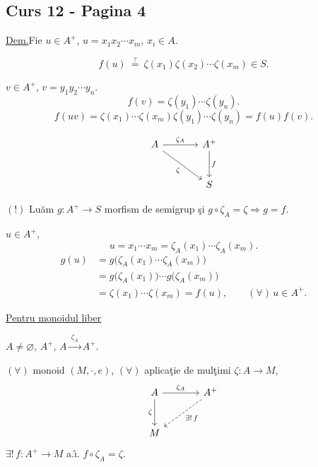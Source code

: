 
\subsection*{Curs 12 - Pagina 4}

\noindent\underline{Dem.}\quad Fie $u\in A^+$,
$u=x_1x_2\cdots x_m$, $x_i\in A$.

\[
f(u)\ \overset{?}{=}\ \zeta(x_1)\zeta(x_2)\cdots\zeta(x_m)\in S.
\]

\noindent $v\in A^+$, $v=y_1y_2\cdots y_n$.
\[
f(v)=\zeta(y_1)\cdots\zeta(y_n).
\]
\[
f(uv)=\zeta(x_1)\cdots\zeta(x_m)\zeta(y_1)\cdots\zeta(y_n)
=f(u)f(v).
\]

\[
\begin{tikzcd}[column sep=large,row sep=large]
A \arrow[r,"\zeta_A"] \arrow[dr,"\zeta"'] & A^+ \arrow[d,"f"] \\
& S
\end{tikzcd}
\]

\medskip
\noindent $(!)$ Lu\u{a}m $g:A^+\longrightarrow S$ morfism de semigrup
\c{s}i $g\circ\zeta_A=\zeta\Rightarrow g=f$.

\medskip
\noindent $u\in A^+$,
\[
u=x_1\cdots x_m=\zeta_A(x_1)\cdots\zeta_A(x_m).
\]
\begin{align*}
g(u)
 &=g\bigl(\zeta_A(x_1)\cdots\zeta_A(x_m)\bigr)\\
 &=g\bigl(\zeta_A(x_1)\bigr)\cdots g\bigl(\zeta_A(x_m)\bigr)\\
 &=\zeta(x_1)\cdots\zeta(x_m)=f(u),
 \qquad (\forall)\,u\in A^+.
\end{align*}

\bigskip
\noindent{}\quad\underline{Pentru monoidul liber}

\medskip
\noindent $A\neq\varnothing$, $A^+$,
\quad $A\xrightarrow{\ \zeta_A\ }A^+$.

\medskip
\noindent $(\forall)$ monoid $(M,\cdot,e)$, $(\forall)$ aplica\c{t}ie de mul\c{t}imi
$\zeta:A\longrightarrow M$,
\[
\begin{tikzcd}[column sep=large,row sep=large]
A \arrow[r,"\zeta_A"] \arrow[d,"\zeta"'] & A^+ \arrow[dl,dashed,"\exists!\,f"] \\
M &
\end{tikzcd}
\]
\noindent $\exists!\,f:A^+\longrightarrow M$ a.\^{\i}. $f\circ\zeta_A=\zeta$.

